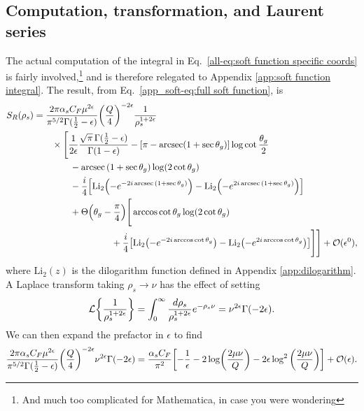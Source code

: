 \documentclass[../thesis.tex]{subfiles}
\providecommand{\Li}{\mathrm{Li}}
\providecommand{\cL}{\mathcal{L}}
\providecommand{\cO}{\mathcal{O}}
\begin{document}
\subsection{Computation, transformation, and Laurent series}
	The actual computation of the integral in Eq.~\ref{all-eq:soft function specific coords} is fairly involved,\footnote{And much too complicated for Mathematica, in case you were wondering} and is therefore relegated to Appendix \ref{app:soft function integral}. The result, from Eq.~\ref{app_soft-eq:full soft function}, is
	\begin{equation}
	\begin{aligned}
		S_R(\rho_s) &= \frac{2\pi\alpha_s C_F\mu^{2\epsilon}}{\pi^{5/2} \Gamma(\frac{1}{2} - \epsilon)}\qty(\frac{Q}{4})^{-2\epsilon} \frac{1}{\rho_s^{1 + 2\epsilon}} \\
			&\qquad\times \Bigg[\frac{1}{2\epsilon}\frac{\sqrt{\pi} \, \Gamma(\frac{1}{2} - \epsilon)}{\Gamma(1 - \epsilon)} - \qty[\pi - \arcsec(1 + \sec\theta_g)]\log\cot\frac{\theta_g}{2} \\
			&\qquad\qquad - \arcsec\qty(1 + \sec\theta_g) \log(2\cot\theta_g) \\
			&\qquad\qquad - \frac{i}{4}\qty[\Li_2\qty(-e^{-2i\arcsec\qty(1 + \sec\theta_g)}) - \Li_2\qty(-e^{2i\arcsec\qty(1 + \sec\theta_g)})] \\
			&\qquad\qquad+ \Theta\qty(\theta_g - \frac{\pi}{4})\Bigg[ \arccos\cot\theta_g \log(2\cot\theta_g) \\
			&\hspace{3cm}+ \frac{i}{4}\qty[\Li_2\qty(-e^{-2i\arccos\cot\theta_g}) - \Li_2\qty(-e^{2i\arccos\cot\theta_g})] \Bigg] \Bigg] + \cO(\epsilon^0),
	\end{aligned}
	\end{equation}
	where $\Li_2(z)$ is the dilogarithm function defined in Appendix \ref{app:dilogarithm}. A Laplace transform taking $\rho_s \to \nu$ has the effect of setting
	\begin{equation}
		\cL\qty{\frac{1}{\rho_s^{1 + 2\epsilon}}} = \int_0^\infty \frac{d\rho_s}{\rho_s^{1 + 2\epsilon}} e^{-\rho_s \nu} = \nu^{2\epsilon}\Gamma(-2\epsilon).
	\end{equation}
	We can then expand the prefactor in $\epsilon$ to find
	\begin{equation}
		\frac{2\pi\alpha_s C_F\mu^{2\epsilon}}{\pi^{5/2} \Gamma(\frac{1}{2} - \epsilon)}\qty(\frac{Q}{4})^{-2\epsilon} \nu^{2\epsilon}\Gamma(-2\epsilon) = \frac{\alpha_s C_F}{\pi^2} \qty[-\frac{1}{\epsilon} - 2\log(\frac{2\mu \nu}{Q}) - 2\epsilon \log^2 \qty(\frac{2\mu\nu}{Q})] + \cO(\epsilon).
	\end{equation}
\end{document}
